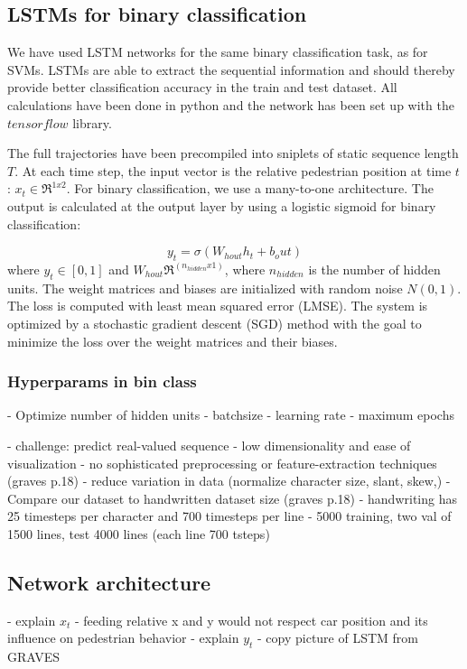 \subsection{LSTMs for binary classification}
We have used LSTM networks for the same binary classification task, as for SVMs. LSTMs are able to extract the sequential information and should thereby provide better classification accuracy in the train and test dataset. All calculations have been done in python and the network has been set up with the $\textit{tensorflow}$ library.

The full trajectories have been precompiled into sniplets of static sequence length $T$. At each time step, the input vector is the relative pedestrian position at time $t$: $x_t \in \Re^{1x2}$. For binary classification, we use a many-to-one architecture. The output is calculated at the output layer by using a logistic sigmoid for binary classification:

\begin{equation}
y_t = \sigma(W_{hout}h_t + b_out)
\label{eq:bin_class_out} 
\end{equation}
where $y_t \in [0,1]$ and $W_{hout} \Re^(n_{hidden} x 1)$, where $n_{hidden}$ is the number of hidden units. The weight matrices and biases are initialized with random noise $N(0,1)$. The loss is computed with least mean squared error (LMSE). The system is optimized by a stochastic gradient descent (SGD) method with the goal to minimize the loss over the weight matrices and their biases.

\subsubsection{Hyperparams in bin class}
- Optimize number of hidden units
- batchsize
- learning rate
- maximum epochs
 


- challenge: predict real-valued sequence
- low dimensionality and ease of visualization
- no sophisticated preprocessing or feature-extraction techniques (graves p.18)
	- reduce variation in data (normalize character size, slant, skew,)
- Compare our dataset to handwritten dataset size (graves p.18)
- handwriting has 25 timesteps per character and 700 timesteps per line
- 5000 training, two val of 1500 lines, test 4000 lines (each line 700 tsteps)


\subsection{Network architecture}
- explain $x_t$
	- feeding relative x and y would not respect car position and its influence on pedestrian behavior
- explain $y_t$
- copy picture of LSTM from GRAVES

